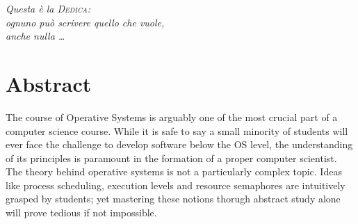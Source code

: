 \documentclass[12pt,a4paper,openright,twoside]{report}
\begin{document}
\begin{titlepage}                       %
%
\thispagestyle{empty}                   %
\topmargin=6.5cm                        %
\raggedleft                             %
\large                                  %
\em                                     %
Questa \`e la \textsc{Dedica}:\\
ognuno pu\`o scrivere quello che vuole, \\
anche nulla \ldots                      %
\newpage                                %



\clearpage{\pagestyle{empty}\cleardoublepage}%
\end{titlepage}
\chapter*{Abstract}                 %
The course of Operative Systems is arguably one of the most crucial part of 
a computer science course. While it is safe to say a small minority of students
will ever face the challenge to develop software below the OS level, the 
understanding of its principles is paramount in the formation of a proper computer
scientist.
The theory behind operative systems is not a particularly complex topic. Ideas 
like process scheduling, execution levels and resource semaphores are intuitively
grasped by students; yet mastering these notions thorugh abstract study alone
will prove tedious if not impossible. 
\end{document}
